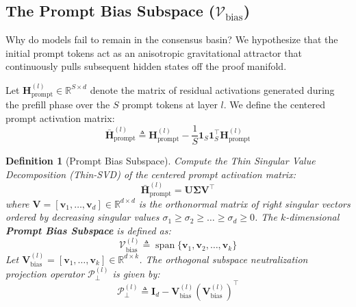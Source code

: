 \documentclass[10pt,twocolumn]{article}
\newtheorem{definition}{Definition}
\begin{document}
\subsection{The Prompt Bias Subspace (\texorpdfstring{$\mathcal{V}_{\text{bias}}$}{V\_bias})}
\label{sec:subspace}
Why do models fail to remain in the consensus basin? We hypothesize that the initial prompt tokens act as an anisotropic gravitational attractor that continuously pulls subsequent hidden states off the proof manifold.

Let $\mathbf{H}_{\text{prompt}}^{(l)} \in \mathbb{R}^{S \times d}$ denote the matrix of residual activations generated during the prefill phase over the $S$ prompt tokens at layer $l$. We define the centered prompt activation matrix:
\begin{equation}
    \bar{\mathbf{H}}_{\text{prompt}}^{(l)} \triangleq \mathbf{H}_{\text{prompt}}^{(l)} - \frac{1}{S} \mathbf{1}_{S} \mathbf{1}_{S}^\top \mathbf{H}_{\text{prompt}}^{(l)}
\end{equation}

\begin{definition}[Prompt Bias Subspace]
\label{def:bias_subspace}
Compute the Thin Singular Value Decomposition (Thin-SVD) of the centered prompt activation matrix:
\begin{equation}
    \bar{\mathbf{H}}_{\text{prompt}}^{(l)} = \mathbf{U} \mathbf{\Sigma} \mathbf{V}^\top
\end{equation}
where $\mathbf{V} = [\mathbf{v}_1, \dots, \mathbf{v}_d] \in \mathbb{R}^{d \times d}$ is the orthonormal matrix of right singular vectors ordered by decreasing singular values $\sigma_1 \ge \sigma_2 \ge \dots \ge \sigma_d \ge 0$. The $k$-dimensional \textbf{Prompt Bias Subspace} is defined as:
\begin{equation}
    \mathcal{V}_{\text{bias}}^{(l)} \triangleq \operatorname{span}\{\mathbf{v}_1, \mathbf{v}_2, \dots, \mathbf{v}_k\}
\end{equation}
Let $\mathbf{V}_{\text{bias}}^{(l)} = [\mathbf{v}_1, \dots, \mathbf{v}_k] \in \mathbb{R}^{d \times k}$. The orthogonal subspace neutralization projection operator $\mathcal{P}_{\perp}^{(l)}$ is given by:
\begin{equation}
    \mathcal{P}_{\perp}^{(l)} \triangleq \mathbf{I}_d - \mathbf{V}_{\text{bias}}^{(l)} (\mathbf{V}_{\text{bias}}^{(l)})^\top
\end{equation}
\end{definition}
\end{document}
